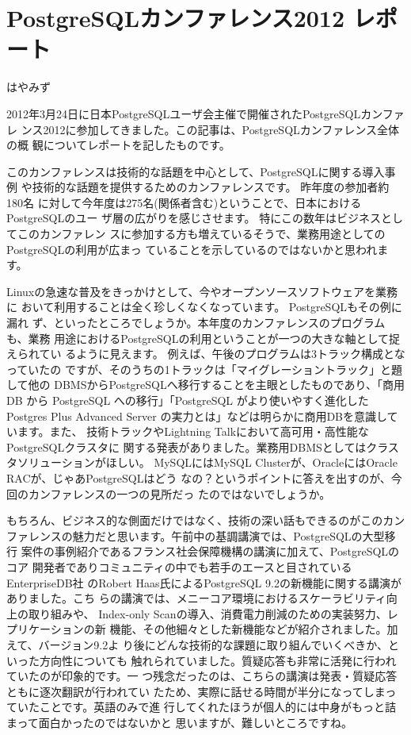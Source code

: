 
\chapter{PostgreSQLカンファレンス2012 レポート}

\begin{flushright}
 {\headfont はやみず}
\end{flushright}

2012年3月24日に日本PostgreSQLユーザ会主催で開催されたPostgreSQLカンファレ
ンス2012に参加してきました。この記事は、PostgreSQLカンファレンス全体の概
観についてレポートを記したものです。

このカンファレンスは技術的な話題を中心として、PostgreSQLに関する導入事例
や技術的な話題を提供するためのカンファレンスです。 昨年度の参加者約180名
に対して今年度は275名(関係者含む)ということで、日本におけるPostgreSQLのユー
ザ層の広がりを感じさせます。 特にこの数年はビジネスとしてこのカンファレン
スに参加する方も増えているそうで、業務用途としてのPostgreSQLの利用が広まっ
ていることを示しているのではないかと思われます。

Linuxの急速な普及をきっかけとして、今やオープンソースソフトウェアを業務に
おいて利用することは全く珍しくなくなっています。 PostgreSQLもその例に漏れ
ず、といったところでしょうか。本年度のカンファレンスのプログラムも、業務
用途におけるPostgreSQLの利用ということが一つの大きな軸として捉えられてい
るように見えます。 例えば、午後のプログラムは3トラック構成となっていたの
ですが、そのうちの1トラックは「マイグレーショントラック」と題して他の
DBMSからPostgreSQLへ移行することを主眼としたものであり、「商用 DB から
PostgreSQL への移行」「PostgreSQL がより使いやすく進化した Postgres Plus
Advanced Server の実力とは」などは明らかに商用DBを意識しています。また、
技術トラックやLightning Talkにおいて高可用・高性能なPostgreSQLクラスタに
関する発表がありました。業務用DBMSとしてはクラスタソリューションがほしい。
MySQLにはMySQL Clusterが、OracleにはOracle RACが、じゃあPostgreSQLはどう
なの？というポイントに答えを出すのが、今回のカンファレンスの一つの見所だっ
たのではないでしょうか。

もちろん、ビジネス的な側面だけではなく、技術の深い話もできるのがこのカン
ファレンスの魅力だと思います。午前中の基調講演では、PostgreSQLの大型移行
案件の事例紹介であるフランス社会保障機構の講演に加えて、PostgreSQLのコア
開発者でありコミュニティの中でも若手のエースと目されているEnterpriseDB社
のRobert Haas氏によるPostgreSQL 9.2の新機能に関する講演がありました。こち
らの講演では、メニーコア環境におけるスケーラビリティ向上の取り組みや、
Index-only Scanの導入、消費電力削減のための実装努力、レプリケーションの新
機能、その他細々とした新機能などが紹介されました。加えて、バージョン9.2よ
り後にどんな技術的な課題に取り組んでいくべきか、といった方向性についても
触れられていました。質疑応答も非常に活発に行われていたのが印象的です。一
つ残念だったのは、こちらの講演は発表・質疑応答ともに逐次翻訳が行われてい
たため、実際に話せる時間が半分になってしまっていたことです。英語のみで進
行してくれたほうが個人的には中身がもっと詰まって面白かったのではないかと
思いますが、難しいところですね。

